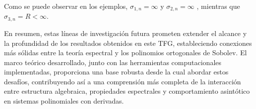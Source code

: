 Como se puede observar en los ejemplos, $\sigma_{1,n} = \infty$ y $\sigma_{2,n} = \infty $ , mientras que $\sigma_{3,n} = R < \infty$.

En resumen, estas líneas de investigación futura prometen extender el alcance y la profundidad de los resultados obtenidos en este TFG, estableciendo conexiones más sólidas entre la teoría espectral y los polinomios ortogonales de Sobolev. El marco teórico desarrollado, junto con las herramientas computacionales implementadas, proporciona una base robusta desde la cual abordar estos desafíos, contribuyendo así a una comprensión más completa de la interacción entre estructura algebraica, propiedades espectrales y comportamiento asintótico en sistemas polinomiales con derivadas.




